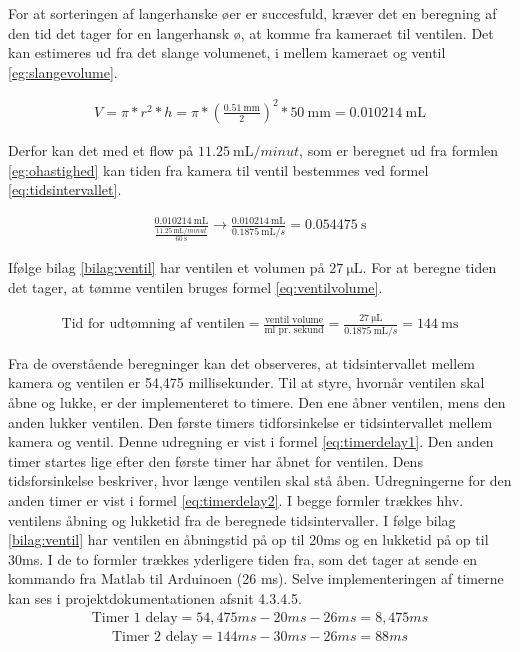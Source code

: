 For at sorteringen af langerhanske øer er succesfuld, kræver det en beregning af den tid det tager for en langerhansk ø, at komme fra kameraet til ventilen. Det kan estimeres ud fra det slange volumenet, i mellem kameraet og ventil \ref{eg:slangevolume}.

\begin{align}
V=\pi*r^2*h=\pi*(\frac{\SI{0,51}{\milli\metre}}{2})^2*\SI{50}{\milli\metre}=\SI{0,010214}{\milli\liter}
\label{eg:slangevolume}
\end{align}

Derfor kan det med et flow på $\SI{11,25}{\milli\liter/minut}$, som er beregnet ud fra formlen \ref{eg:ohastighed} kan tiden fra kamera til ventil bestemmes ved formel \ref{eq:tidsintervallet}. 
 
\begin{align}
\frac{\SI{0,010214}{\milli\liter}}{\frac{\SI{11,25}{\milli\liter/minut}}{\SI{60}{\second}}}\to\frac{\SI{0,010214}{\milli\liter}}{\SI{0,1875}{\milli\liter/s}}=\SI{0.054475}{\second}
\label{eq:tidsintervallet}
\end{align} 

Ifølge bilag \ref{bilag:ventil} har ventilen et volumen på $\SI{27}{\micro\liter}$. For at beregne tiden det tager, at tømme ventilen bruges formel \ref{eq:ventilvolume}. %

\begin{align}
\text{Tid for udtømning af ventilen} = \frac{\text{ventil volume}}{\text{ml pr. sekund}}=\frac{\SI{27}{\micro\liter}}{\SI{0,1875}{\milli\liter/s}}=\SI{144}{\milli\second}
\label{eq:ventilvolume}
\end{align}

Fra de overstående beregninger kan det observeres, at tidsintervallet mellem kamera og ventilen er 54,475 millisekunder. Til at styre, hvornår ventilen skal åbne og lukke, er der implementeret to timere. Den ene åbner ventilen, mens den anden lukker ventilen. Den første timers tidforsinkelse er tidsintervallet mellem kamera og ventil. Denne udregning er vist i formel \ref{eq:timerdelay1}. Den anden timer startes lige efter den første timer har åbnet for ventilen. Dens tidsforsinkelse beskriver, hvor længe ventilen skal stå åben. Udregningerne for den anden timer er vist i formel \ref{eq:timerdelay2}. I begge formler trækkes hhv. ventilens åbning og lukketid fra de beregnede tidsintervaller. I følge bilag \ref{bilag:ventil} har ventilen en åbningstid på op til 20ms og en lukketid på op til 30ms. I de to formler trækkes yderligere tiden fra, som det tager at sende en kommando fra Matlab til Arduinoen (26 ms). Selve implementeringen af timerne kan ses i projektdokumentationen afsnit 4.3.4.5. 
\begin{align}
\text{Timer 1 delay}=54,475ms-20ms-26ms=8,475ms
\label{eq:timerdelay1}
\end{align} 
\begin{align}
\text{Timer 2 delay}=144ms-30ms-26ms= 88ms
\label{eq:timerdelay2}
\end{align} 

